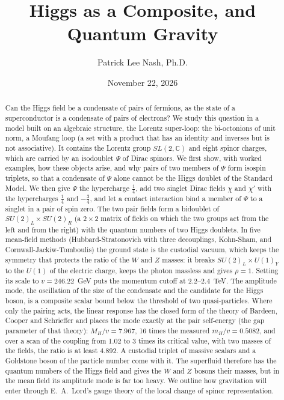 \documentclass[aps,prd,twocolumn,superscriptaddress,nofootinbib,floatfix,longbibliography]{revtex4-2}
\begin{document}
\title{Higgs as a Composite, and Quantum Gravity}

\author{Patrick Lee Nash, Ph.D.}

\date{November 22, 2026}

\begin{abstract}
Can the Higgs field be a condensate of pairs of fermions, as the state of a superconductor is a condensate of pairs of
electrons? We study this question in a model built on an algebraic structure, the Lorentz super-loop: the bi-octonions
of unit norm, a Moufang loop (a set with a product that has an identity and inverses but is not associative). It
contains the Lorentz group $SL(2,\mathbb C)$ and eight spinor charges, which are carried by an isodoublet $\Psi$ of
Dirac spinors. We first show, with worked examples, how these objects arise, and why pairs of two members of $\Psi$
form isospin triplets, so that a condensate of $\Psi$ alone cannot be the Higgs doublet of the Standard Model. We then
give $\Psi$ the hypercharge $\frac14$, add two singlet Dirac fields $\chi$ and $\chi'$ with the hypercharges $\frac14$
and $-\frac34$, and let a contact interaction bind a member of $\Psi$ to a singlet in a pair of spin zero. The two pair
fields form a bidoublet of $SU(2)_L\times SU(2)_R$ (a $2\times2$ matrix of fields on which the two groups act from the
left and from the right) with the quantum numbers of two Higgs doublets. In five mean-field methods (Hubbard-Stratonovich
with three decouplings, Kohn-Sham, and Cornwall-Jackiw-Tomboulis) the ground state is the custodial vacuum, which keeps
the symmetry that protects the ratio of the $W$ and $Z$ masses: it breaks $SU(2)_L\times U(1)_Y$ to the $U(1)$ of the electric charge, keeps the photon massless
and gives $\rho=1$. Setting its scale to $v=246.22$~GeV puts the momentum cutoff at 2.2\mbox{--}2.4~TeV. The amplitude
mode, the oscillation of the size of the condensate and the candidate for the Higgs boson, is a composite scalar bound
below the threshold of two quasi-particles. Where only the pairing acts, the linear response has the closed form of the
theory of Bardeen, Cooper and Schrieffer and places the mode exactly at the pair self-energy (the gap parameter of
that theory): $M_H/v=7.967$,
16 times the measured $m_H/v=0.5082$, and over a scan of the coupling from 1.02 to 3 times its critical
value, with two masses of the fields, the ratio is at least \ensuremath{4.892}. A custodial triplet of massive scalars and
a Goldstone boson of the particle number come with it. The superfluid therefore has the quantum numbers of the Higgs
field and gives the $W$ and $Z$ bosons their masses, but in the mean field its amplitude mode is far too heavy. We
outline how gravitation will enter through E.~A.~Lord's gauge theory of the local change of spinor representation.
\end{abstract}
\end{document}
